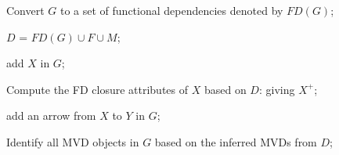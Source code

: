 \DontPrintSemicolon

 Convert $G$ to a set of functional dependencies denoted by $FD(G)$;
 
$D$ = $FD(G) \cup F \cup M$;
 
{
        {
        add $X$ in $G$;
        }
        

        Compute the FD closure attributes of $X$ based on $D$: giving $X^+$;

        {
            {
            add an arrow from $X$ to $Y$ in $G$;
            }
        }

       Identify all MVD objects in $G$ based on the inferred MVDs from $D$;
}
